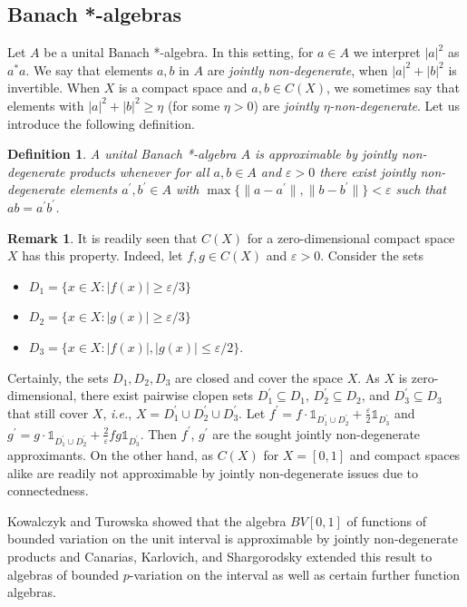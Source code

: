 \documentclass[12pt,fleqn]{amsart}
\newtheorem{definition}[theorem]{Definition}
\theoremstyle{definition}
\newtheorem{remark}[theorem]{Remark}
\numberwithin{equation}{section}
\theoremstyle{remark}
\begin{document}
\subsection{Banach *-algebras} Let $A$ be a unital Banach *-algebra. In this setting, for $a\in A$ we interpret $|a|^2$ as $a^*a$. We say that elements $a,b$ in $A$ are \emph{jointly non-degenerate}, when $|a|^2+|b|^2$ is invertible. When $X$ is a compact space and $a,b \in C(X)$, we sometimes say that elements with $|a|^2+|b|^2 \geqslant \eta$ (for some $\eta > 0$) are \emph{jointly $\eta$-non-degenerate}. Let us introduce the following definition.
%
\begin{definition}\label{df23}
    A unital Banach *-algebra $A$ is \emph{approximable by jointly non-degenerate products} whenever for all $a,b\in A$ and $\varepsilon > 0$ there exist jointly non-degenerate elements $a^\prime, b^\prime\in A$ with $\max \{ \|a-a^\prime\|, \|b-b^\prime\| \}<\varepsilon$ such that $ab = a^\prime b^\prime$.  
\end{definition}
\begin{remark}It is readily seen that $C(X)$ for a zero-dimensional compact space $X$ has this property. Indeed, let $f,g\in C(X)$ and $\varepsilon> 0$. Consider the sets
%
\begin{itemize}
    \item $D_1 = \{x\in X\colon |f(x)|\geqslant \varepsilon/ 3\}$
    \item $D_2 =  \{x\in X\colon |g(x)|\geqslant \varepsilon/ 3\}$
    \item $D_3 = \{x\in X\colon |f(x)|, |g(x)| \leqslant \varepsilon/2\}$.
\end{itemize}
%
Certainly, the sets $D_1, D_2, D_3$ are closed and cover the space $X$. As $X$ is zero-dimensional, there exist pairwise clopen sets $D_1^\prime \subseteq D_1$, $D_2^\prime \subseteq D_2$, and $D_3^\prime \subseteq D_3$ that still cover $X$, \emph{i.e.}, $X = D_1^\prime \cup D_2^\prime \cup D_3^\prime$. Let $f^\prime = f \cdot \mathds{1}_{D_1^\prime\cup D_2^\prime} + \tfrac{\varepsilon}{2}\mathds{1}_{D_3^\prime}$ and $g^\prime = g \cdot \mathds{1}_{D_1^\prime\cup D_2^\prime} + \tfrac{2}{\varepsilon}fg\mathds{1}_{D_3^\prime}$. Then $f^\prime$, $g^\prime$ are the sought jointly non-degenerate approximants. On the other hand, as $C(X)$ for $X = [0,1]$ and compact spaces alike are readily not approximable by jointly non-degenerate issues due to connectedness.
\end{remark}


Kowalczyk and Turowska \cite{kowalczyk2019multiplication} showed that the algebra $BV[0,1]$ of functions of bounded variation on the unit interval is approximable by jointly non-degenerate products and Canarias, Karlovich, and Shargorodsky \cite{canarias2021multiplication} extended this result to algebras of bounded $p$-variation on the interval as well as certain further function algebras.
\end{document}
